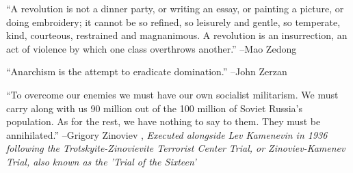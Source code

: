 \documentclass{article}%
\begin{document}
\linebreak%
\vspace{1mm}%
\begin{minipage}{\textwidth}%
\flushleft%
“A revolution is not a dinner party, or writing an essay, or painting a picture, or doing embroidery; it cannot be so refined, so leisurely and gentle, so temperate, kind, courteous, restrained and magnanimous. A revolution is an insurrection, an act of violence by which one class overthrows another.”%
\linebreak%
\vspace{1mm}%
–Mao Zedong%
\linebreak%
\vspace{1mm}%
\end{minipage}%
\linebreak%
\vspace{1mm}%
\begin{minipage}{\textwidth}%
\flushleft%
“Anarchism is the attempt to eradicate domination.”%
\linebreak%
\vspace{1mm}%
–John Zerzan%
\linebreak%
\vspace{1mm}%
\end{minipage}%
\linebreak%
\vspace{1mm}%
\begin{minipage}{\textwidth}%
\flushleft%
“To overcome our enemies we must have our own socialist militarism. We must carry along with us 90 million out of the 100 million of Soviet Russia's population. As for the rest, we have nothing to say to them. They must be annihilated.”%
\linebreak%
\vspace{1mm}%
–Grigory Zinoviev%
, \textit{Executed alongside Lev Kamenevin in 1936 following the Trotskyite-Zinovievite Terrorist Center Trial, or Zinoviev-Kamenev Trial, also known as the 'Trial of the Sixteen'}%
\linebreak%
\vspace{1mm}%
\end{minipage}%
\linebreak%
\vspace{1mm}

%
\end{document}
